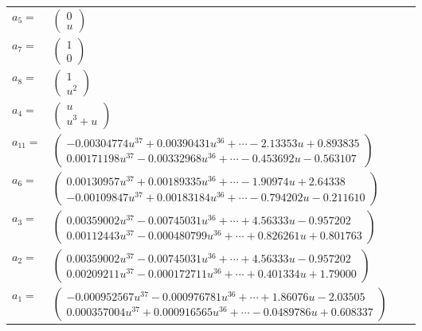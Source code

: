 \documentclass[1p]{elsarticle_modified}
\theoremstyle{definition}
\begin{document}
\begin{tabular}{m{7pt} m{180pt} m{7pt} m{180pt} }
\flushright $a_{5}=$&$\begin{pmatrix}0\\u\end{pmatrix}$ \\
\flushright $a_{7}=$&$\begin{pmatrix}1\\0\end{pmatrix}$ \\
\flushright $a_{8}=$&$\begin{pmatrix}1\\u^2\end{pmatrix}$ \\
\flushright $a_{4}=$&$\begin{pmatrix}u\\u^3+u\end{pmatrix}$ \\
\flushright $a_{11}=$&$\begin{pmatrix}-0.00304774 u^{37}+0.00390431 u^{36}+\cdots-2.13353 u+0.893835\\0.00171198 u^{37}-0.00332968 u^{36}+\cdots-0.453692 u-0.563107\end{pmatrix}$ \\
\flushright $a_{6}=$&$\begin{pmatrix}0.00130957 u^{37}+0.00189335 u^{36}+\cdots-1.90974 u+2.64338\\-0.00109847 u^{37}+0.00183184 u^{36}+\cdots-0.794202 u-0.211610\end{pmatrix}$ \\
\flushright $a_{3}=$&$\begin{pmatrix}0.00359002 u^{37}-0.00745031 u^{36}+\cdots+4.56333 u-0.957202\\0.00112443 u^{37}-0.000480799 u^{36}+\cdots+0.826261 u+0.801763\end{pmatrix}$ \\
\flushright $a_{2}=$&$\begin{pmatrix}0.00359002 u^{37}-0.00745031 u^{36}+\cdots+4.56333 u-0.957202\\0.00209211 u^{37}-0.000172711 u^{36}+\cdots+0.401334 u+1.79000\end{pmatrix}$ \\
\flushright $a_{1}=$&$\begin{pmatrix}-0.000952567 u^{37}-0.000976781 u^{36}+\cdots+1.86076 u-2.03505\\0.000357004 u^{37}+0.000916565 u^{36}+\cdots-0.0489786 u+0.608337\end{pmatrix}$ \\

\end{tabular}
\end{document}
